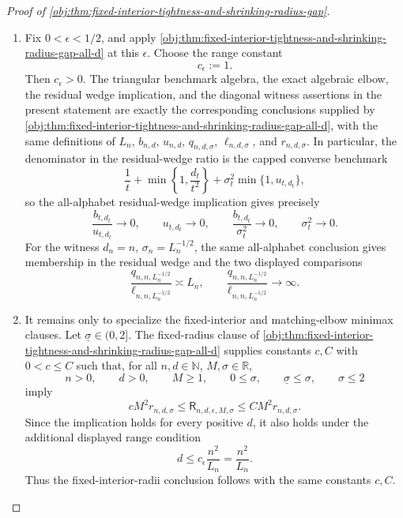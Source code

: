 \documentclass[11pt]{article}
\begin{document}
\begin{proof}[Proof of \cref{obj:thm:fixed-interior-tightness-and-shrinking-radius-gap}]
\begin{enumerate}
\item Fix \(0<\epsilon<1/2\), and apply \cref{obj:thm:fixed-interior-tightness-and-shrinking-radius-gap-all-d} at this \(\epsilon\).  Choose the range constant
\[
c_\epsilon:=1 .
\]
Then \(c_\epsilon>0\).  The triangular benchmark algebra, the exact algebraic elbow, the residual wedge implication, and the diagonal witness assertions in the present statement are exactly the corresponding conclusions supplied by \cref{obj:thm:fixed-interior-tightness-and-shrinking-radius-gap-all-d}, with the same definitions of \(L_n\), \(b_{n,d}\), \(u_{n,d}\), \(q_{n,d,\sigma}\), \(\ell_{n,d,\sigma}\), and \(r_{n,d,\sigma}\).  In particular, the denominator in the residual-wedge ratio is the capped converse benchmark
\[
\frac1t+\min\left\{1,\frac{d_t}{t^2}\right\}
+\sigma_t^2\min\{1,u_{t,d_t}\},
\]
so the all-alphabet residual-wedge implication gives precisely
\[
\frac{b_{t,d_t}}{u_{t,d_t}}\to0,\qquad
u_{t,d_t}\to0,\qquad
\frac{b_{t,d_t}}{\sigma_t^2}\to0,\qquad
\sigma_t^2\to0 .
\]
For the witness \(d_n=n\), \(\sigma_n=L_n^{-1/2}\), the same all-alphabet conclusion gives membership in the residual wedge and the two displayed comparisons
\[
\frac{q_{n,n,L_n^{-1/2}}}{\ell_{n,n,L_n^{-1/2}}}\asymp L_n,
\qquad
\frac{q_{n,n,L_n^{-1/2}}}{\ell_{n,n,L_n^{-1/2}}}\to\infty .
\]

\item It remains only to specialize the fixed-interior and matching-elbow minimax clauses.  Let \(\underline\sigma\in(0,2]\).  The fixed-radius clause of \cref{obj:thm:fixed-interior-tightness-and-shrinking-radius-gap-all-d} supplies constants \(c,C\) with \(0<c\le C\) such that, for all \(n,d\in\mathbb N\), \(M,\sigma\in\mathbb R\),
\[
n>0,\qquad d>0,\qquad M\ge1,\qquad
0\le\sigma,\qquad \underline\sigma\le\sigma,\qquad \sigma\le2
\]
imply
\[
cM^2r_{n,d,\sigma}
\le
\mathsf R_{n,d,\epsilon,M,\sigma}
\le
CM^2r_{n,d,\sigma}.
\]
Since the implication holds for every positive \(d\), it also holds under the additional displayed range condition
\[
d\le c_\epsilon\frac{n^2}{L_n}
=\frac{n^2}{L_n}.
\]
Thus the fixed-interior-radii conclusion follows with the same constants \(c,C\).  %


\end{enumerate}
\end{proof}
\end{document}
